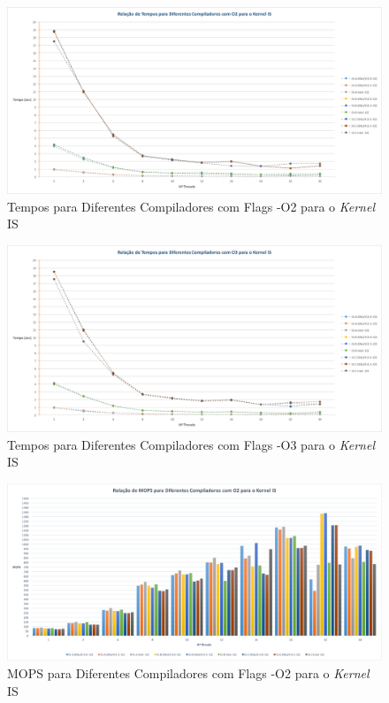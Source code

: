 \documentclass[conference,compsoc]{IEEEtran}
\begin{document}
\begin{figure}[h!]
\centering
\includegraphics[scale=0.25]{OMP/tempos_dif_comp-O2_IS_nodo-641.png}
\caption{Tempos para Diferentes Compiladores com Flags -O2 para o \textit{Kernel} IS}
\end{figure}

\begin{figure}[h!]
\centering
\includegraphics[scale=0.25]{OMP/tempos_dif_comp-O3_IS_nodo-641.png}
\caption{Tempos para Diferentes Compiladores com Flags -O3 para o \textit{Kernel} IS}
\end{figure}

\begin{figure}[h!]
\centering
\includegraphics[scale=0.225]{OMP/mops_dif_comp-O2_IS_nodo-641.png}
\caption{MOPS para Diferentes Compiladores com Flags -O2 para o \textit{Kernel} IS}
\end{figure}
\end{document}
